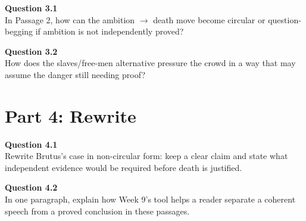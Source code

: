 \documentclass[12pt]{article}
\begin{document}
\textbf{Question 3.1}\\[-0.15em]
In Passage 2, how can the ambition $\rightarrow$ death move become circular or question-begging if ambition is not independently proved?


\textbf{Question 3.2}\\[-0.15em]
How does the slaves/free-men alternative pressure the crowd in a way that may assume the danger still needing proof?


\newpage

\section*{Part 4: Rewrite}

\textbf{Question 4.1}\\[-0.15em]
Rewrite Brutus's case in non-circular form: keep a clear claim and state what independent evidence would be required before death is justified.


\textbf{Question 4.2}\\[-0.15em]
In one paragraph, explain how Week 9's tool helps a reader separate a coherent speech from a proved conclusion in these passages.

\end{document}
